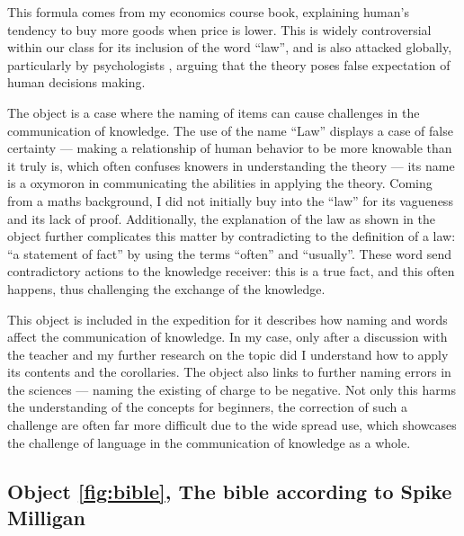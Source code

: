 \documentclass[a4paper,11pt]{article}
\begin{document}
This formula comes from my economics course book, explaining human's tendency to buy more goods when price is lower. This is widely controversial within our class for its inclusion of the word ``law'', and is also attacked globally, particularly by psychologists \parencite{DKahneman}, arguing that the theory poses false expectation of human decisions making.

The object is a case where the naming of items can cause challenges in the communication of knowledge.
The use of the name ``Law'' displays a case of false certainty --- making a relationship of human behavior to be more knowable than it truly is, which often confuses knowers in understanding the theory --- its name is a oxymoron in communicating the abilities in applying the theory. Coming from a maths background, I did not initially buy into the ``law'' for its vagueness and its lack of proof. Additionally, the explanation of the law as shown in the object further complicates this matter by contradicting to the definition of a law: ``a statement of fact'' by using the terms ``often'' and ``usually''. These word send contradictory actions to the knowledge receiver: this is a true fact, and this often happens, thus challenging the exchange of the knowledge.

This object is included in the expedition for it describes how naming and words affect the communication of knowledge. In my case, only after a discussion with the teacher and my further research on the topic did I understand how to apply its contents and the corollaries. The object also links to further naming errors in the sciences --- naming the existing of charge to be negative. Not only this harms the understanding of the concepts for beginners, the correction of such a challenge are often far more difficult due to the wide spread use, which showcases the challenge of language in the communication of knowledge as a whole.


\subsection*{Object \ref{fig:bible}, The bible according to Spike Milligan}
\end{document}
